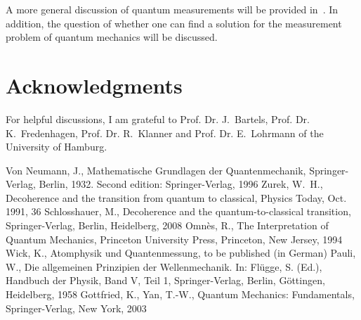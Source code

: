 \documentclass[12pt]{article}
\begin{document}
A more general discussion of quantum measurements will be provided in~\cite{Wick}.  In addition, the question of whether one can find a solution for the measurement problem of quantum mechanics will be discussed.  \\


\section*{Acknowledgments}

For helpful discussions, I am grateful to Prof. Dr. J.~Bar\-tels, 
Prof. Dr. K.~Fre\-den\-hagen, Prof. Dr. R.~Klan\-ner and 
Prof. Dr. E.~Lohr\-mann of the University of Hamburg.  


\begin{thebibliography}{9999}

 Von Neumann, J., Mathematische Grundlagen der Quan\-ten\-mecha\-nik, Sprin\-ger-Ver\-lag, Berlin, 1932. Second edition: Sprin\-ger-Ver\-lag, 1996  
%
 Zurek, W.~H., Decoherence and the transition from quantum to classical, Physics Today, Oct. 1991, 36 
%
 Schlosshauer, M., Decoherence and the quantum-to-classical transition, Sprin\-ger-Ver\-lag, Ber\-lin, Heidel\-berg, 2008  
%
 Omn\`es, R., The Interpretation of Quantum Mechanics, Princeton University Press, Princeton, New Jersey, 1994  
%
 Wick, K., Atom\-physik und Quanten\-messung, to be published (in German)  
%
 Pauli, W., Die allgemeinen Prinzipien der Wellen\-mechanik. In: Fl\"ug\-ge, S. (Ed.), Hand\-buch der Phy\-sik, Band V, Teil 1, Sprin\-ger-Ver\-lag, Berlin, G\"ot\-tin\-gen, Heidel\-berg, 1958  
%
 Gottfried, K., Yan, T.-W., Quantum Mechanics: Fundamentals, Springer-Verlag, New York, 2003 
%
\end{thebibliography} 
\end{document}

